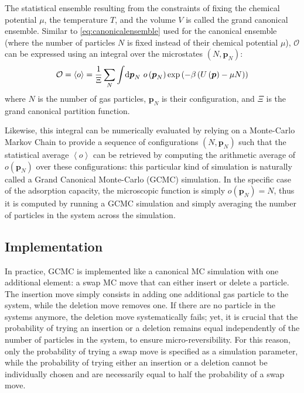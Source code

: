 \documentclass[main.tex]{subfiles}
\begin{document}
The statistical ensemble resulting from the constraints of fixing the chemical potential $\mu$, the temperature $T$, and the volume $V$ is called the grand canonical ensemble. Similar to \cref{eq:canonicalensemble} used for the canonical ensemble (where the number of particles $N$ is fixed instead of their chemical potential $\mu$), $\mathcal O$ can be expressed using an integral over the microstates $(N,\boldsymbol p_N)$:
\[\mathcal O = \left<o\right> = \frac1\Xi\sum_N\int\!\text d{\boldsymbol p_N}\  o\left({\boldsymbol p_N}\right)\exp\left(-\beta \left(U\left({\boldsymbol p}\right) - \mu N\right)\right)\label{eq:grandcanonicalensemble}\]
where $N$ is the number of gas particles, $\boldsymbol p_N$ is their configuration, and $\Xi$ is the grand canonical partition function.

Likewise, this integral can be numerically evaluated by relying on a Monte-Carlo Markov Chain to provide a sequence of configurations $(N, \boldsymbol p_N)$ such that the statistical average $\left<o\right>$ can be retrieved by computing the arithmetic average of $o\left({\boldsymbol p_N}\right)$ over these configurations: this particular kind of simulation is naturally called a Grand Canonical Monte-Carlo (GCMC) simulation. In the specific case of the adsorption capacity, the microscopic function is simply $o\left({\boldsymbol p_N}\right) = N$, thus it is computed by running a GCMC simulation and simply averaging the number of particles in the system across the simulation.

\subsection{Implementation}

In practice, GCMC is implemented like a canonical MC simulation with one additional element: a swap MC move that can either insert or delete a particle. The insertion move simply consists in adding one additional gas particle to the system, while the deletion move removes one. If there are no particle in the systems anymore, the deletion move systematically fails; yet, it is crucial that the probability of trying an insertion or a deletion remains equal independently of the number of particles in the system, to ensure micro-reversibility. For this reason, only the probability of trying a swap move is specified as a simulation parameter, while the probability of trying either an insertion or a deletion cannot be individually chosen and are necessarily equal to half the probability of a swap move.
\end{document}
